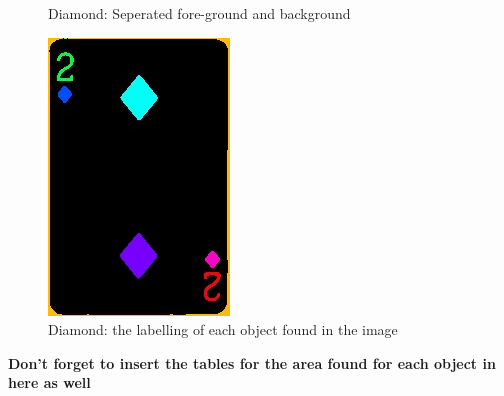 \documentclass[conference]{IEEEtran}
\begin{document}
\begin{figure}[!htb]
\begin{minipage}[b]{0.2\textwidth}
    \caption{Diamond: Seperated fore-ground and background}
    \label{Diamond: Seperated fore-ground and background}
  \end{minipage}
  \hfill
  \begin{minipage}[b]{0.2\textwidth}
    \includegraphics[width=\textwidth]{../programme/results/Task_3/diamond/image_1.jpg}
    \caption{Diamond: the labelling of each object found in the image}
    \label{Diamond: the labelling of each object found in the image}
  \end{minipage}
\end{figure}

\textbf{Don't forget to insert the tables for the area found for each object in here as well}
\end{document}
